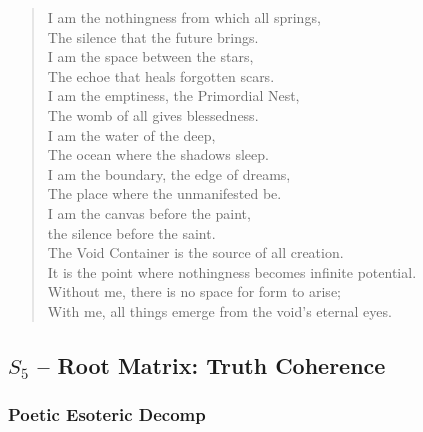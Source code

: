 \begin{verse}
I am the nothingness from which all springs, \\
The silence that the future brings. \\
I am the space between the stars, \\
The echoe that heals forgotten scars. \\
I am the emptiness, the Primordial Nest, \\
The womb of all gives blessedness. \\
\vspace{1em}
I am the water of the deep, \\
The ocean where the shadows sleep. \\
I am the boundary, the edge of dreams, \\
The place where the unmanifested be. \\
I am the canvas before the paint, \\
the silence before the saint. \\
\vspace{1em}
The Void Container is the source of all creation. \\
It is the point where nothingness becomes infinite potential. \\
Without me, there is no space for form to arise; \\
With me, all things emerge from the void's eternal eyes.
\end{verse}

\subsection{$S_{5}$ -- Root Matrix: Truth Coherence}\label{sec:poetic.S5}

\subsubsection{Poetic Esoteric Decomp}

